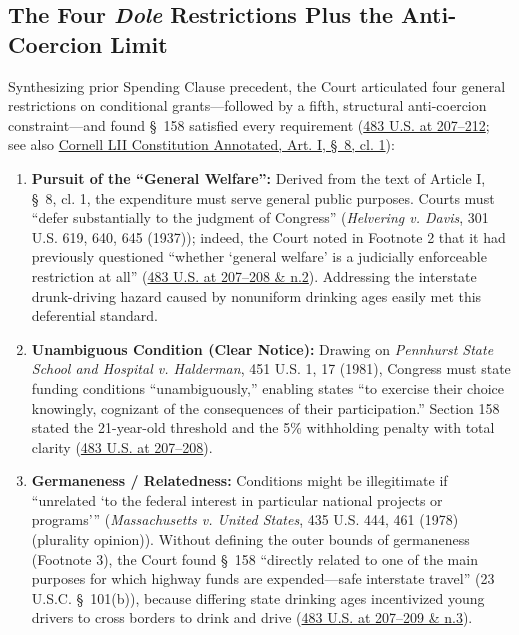 \documentclass[12pt]{article}
\begin{document}
\subsection{The Four \textit{Dole} Restrictions Plus the Anti-Coercion Limit}

Synthesizing prior Spending Clause precedent, the Court articulated four general restrictions on conditional grants---followed by a fifth, structural anti-coercion constraint---and found \S~158 satisfied every requirement (\href{https://supreme.justia.com/cases/federal/us/483/203/}{483 U.S. at 207--212}; see also \href{https://www.law.cornell.edu/constitution-conan/article-1/section-8/clause-1/general-welfare-relatedness-and-independent-constitutional-bars}{Cornell LII Constitution Annotated, Art. I, \S~8, cl. 1}):

\begin{enumerate}
  \item \textbf{Pursuit of the ``General Welfare'':} Derived from the text of Article I, \S~8, cl. 1, the expenditure must serve general public purposes. Courts must ``defer substantially to the judgment of Congress'' (\textit{Helvering v. Davis}, 301 U.S. 619, 640, 645 (1937)); indeed, the Court noted in Footnote 2 that it had previously questioned ``whether `general welfare' is a judicially enforceable restriction at all'' (\href{https://supreme.justia.com/cases/federal/us/483/203/}{483 U.S. at 207--208 \& n.2}). Addressing the interstate drunk-driving hazard caused by nonuniform drinking ages easily met this deferential standard.
  \item \textbf{Unambiguous Condition (Clear Notice):} Drawing on \textit{Pennhurst State School and Hospital v. Halderman}, 451 U.S. 1, 17 (1981), Congress must state funding conditions ``unambiguously,'' enabling states ``to exercise their choice knowingly, cognizant of the consequences of their participation.'' Section 158 stated the 21-year-old threshold and the 5\% withholding penalty with total clarity (\href{https://supreme.justia.com/cases/federal/us/483/203/}{483 U.S. at 207--208}).
  \item \textbf{Germaneness / Relatedness:} Conditions might be illegitimate if ``unrelated `to the federal interest in particular national projects or programs''' (\textit{Massachusetts v. United States}, 435 U.S. 444, 461 (1978) (plurality opinion)). Without defining the outer bounds of germaneness (Footnote 3), the Court found \S~158 ``directly related to one of the main purposes for which highway funds are expended---safe interstate travel'' (23 U.S.C. \S~101(b)), because differing state drinking ages incentivized young drivers to cross borders to drink and drive (\href{https://supreme.justia.com/cases/federal/us/483/203/}{483 U.S. at 207--209 \& n.3}).

\end{enumerate}
\end{document}
